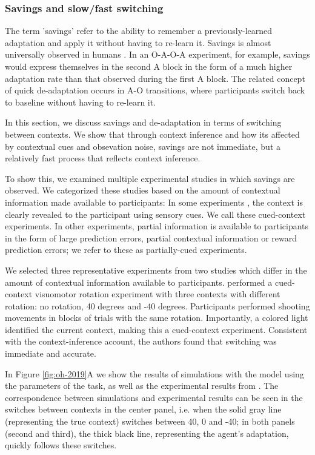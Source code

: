 \documentclass[a4paper,doc,floatsintext,natbib]{apa6}
\def \fref #1{Figure \ref{#1}}     %
\begin{document}
\subsubsection{Savings and slow/fast switching}
The term 'savings' refer to the ability to remember a previously-learned adaptation and apply it without having to re-learn it. Savings is almost universally observed in humans \citep{Brashers-Krug_Consolidation_1996,Shadmehr_Functional_1997,Medina_Mechanism_2001,Smith_Interacting_2006,Zarahn_Explaining_2008}. In an O-A-O-A experiment, for example, savings would express themselves in the second A block in the form of a much higher adaptation rate than that observed during the first A block. The related concept of quick de-adaptation occurs in A-O transitions, where participants switch back to baseline without having to re-learn it.

In this section, we discuss savings and de-adaptation in terms of switching between contexts. We show that through context inference and how its affected by contextual cues and obsevation noise, savings are not immediate, but a relatively fast process that reflects context inference.

To show this, we examined multiple experimental studies in which savings are observed. We categorized these studies based on the amount of contextual information made available to participants: In some experiments \citep[e.g.][]{Kim_Neural_2015,Lee_Dual_2009}, the context is clearly revealed to the participant using sensory cues. We call these cued-context experiments. In other experiments, partial information is available to participants \citep[e.g.][]{Davidson_Scaling_2004,Zarahn_Explaining_2008} in the form of large prediction errors, partial contextual information or reward prediction errors; we refer to these as partially-cued experiments.

We selected three representative experiments from two studies \citep{Kim_Neural_2015,Oh_Minimizing_2019} which differ in the amount of contextual information available to participants. \cite{Kim_Neural_2015} performed a cued-context visuomotor rotation experiment with three contexts with different rotation: no rotation, 40 degrees and -40 degrees. Participants performed shooting movements in blocks of trials with the same rotation. Importantly, a colored light identified the current context, making this a cued-context experiment. Consistent with the context-inference account, the authors found that switching was immediate and accurate.

In \fref{fig:oh-2019}A we show the results of simulations with the model using the parameters of the task, as well as the experimental results from \cite{Kim_Neural_2015}. The correspondence between simulations and experimental results can be seen in the switches between contexts in the center panel, i.e. when the solid gray line (representing the true context) switches between 40, 0 and -40; in both panels (second and third), the thick black line, representing the agent's adaptation, quickly follows these switches.
\end{document}

